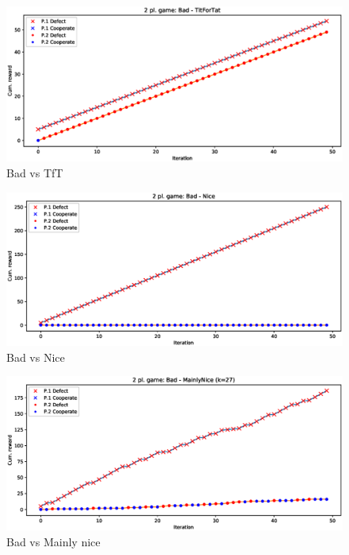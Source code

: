 \documentclass[journal,a4paper,10pt,twoside]{IEEEtran} %
\begin{document}
\begin{figure}[ht]
    \centering
    \includegraphics[width=1\columnwidth]{../img/ipd2p/ipd2p-rewards-Bad-TitForTat}
    \caption{Bad vs TfT}
    \label{fig:badvstft}
\end{figure}

\begin{figure}[ht]
    \centering
    \includegraphics[width=1\columnwidth]{../img/ipd2p/ipd2p-rewards-Bad-Nice}
    \caption{Bad vs Nice}
    \label{fig:badvsnice}
\end{figure}

\begin{figure}[ht]
    \centering
    \includegraphics[width=1\columnwidth]{../img/ipd2p/ipd2p-rewards-Bad-MainlyNice(k=27)}
    \caption{Bad vs Mainly nice}
    \label{fig:badvsmainlynice}
\end{figure}
\end{document}
